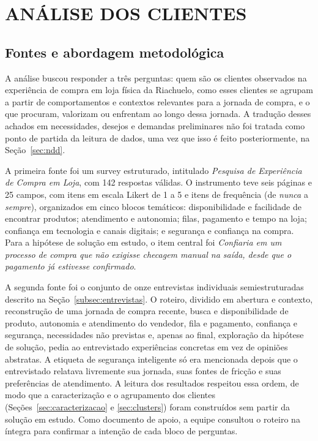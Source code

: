 
\section{ANÁLISE DOS CLIENTES}
\label{sec:analise_clientes}

\subsection{Fontes e abordagem metodológica}

A análise buscou responder a três perguntas: quem são os clientes observados na experiência de compra em loja física da Riachuelo, como esses clientes se agrupam a partir de comportamentos e contextos relevantes para a jornada de compra, e o que procuram, valorizam ou enfrentam ao longo dessa jornada. A tradução desses achados em necessidades, desejos e demandas preliminares não foi tratada como ponto de partida da leitura de dados, uma vez que isso é feito posteriormente, na Seção~\ref{sec:ndd}.

A primeira fonte foi um survey estruturado, intitulado \emph{Pesquisa de Experiência de Compra em Loja}, com 142 respostas válidas. O instrumento teve seis páginas e 25 campos, com itens em escala Likert de 1 a 5 e itens de frequência (de \emph{nunca} a \emph{sempre}), organizados em cinco blocos temáticos: disponibilidade e facilidade de encontrar produtos; atendimento e autonomia; filas, pagamento e tempo na loja; confiança em tecnologia e canais digitais; e segurança e confiança na compra. Para a hipótese de solução em estudo, o item central foi \emph{Confiaria em um processo de compra que não exigisse checagem manual na saída, desde que o pagamento já estivesse confirmado}.

A segunda fonte foi o conjunto de onze entrevistas individuais semiestruturadas descrito na Seção~\ref{subsec:entrevistas}. O roteiro, dividido em abertura e contexto, reconstrução de uma jornada de compra recente, busca e disponibilidade de produto, autonomia e atendimento do vendedor, fila e pagamento, confiança e segurança, necessidades não previstas e, apenas ao final, exploração da hipótese de solução, pedia ao entrevistado experiências concretas em vez de opiniões abstratas. A etiqueta de segurança inteligente só era mencionada depois que o entrevistado relatava livremente sua jornada, suas fontes de fricção e suas preferências de atendimento. A leitura dos resultados respeitou essa ordem, de modo que a caracterização e o agrupamento dos clientes (Seções~\ref{sec:caracterizacao} e \ref{sec:clusters}) foram construídos sem partir da solução em estudo. Como documento de apoio, a equipe consultou o roteiro na íntegra para confirmar a intenção de cada bloco de perguntas.

